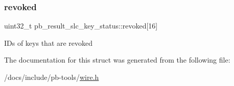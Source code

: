 \subsubsection{\texorpdfstring{revoked}{revoked}}
{\footnotesize\ttfamily uint32\+\_\+t pb\+\_\+result\+\_\+slc\+\_\+key\+\_\+status\+::revoked\mbox{[}16\mbox{]}}

ID\textquotesingle{}s of keys that are revoked 

The documentation for this struct was generated from the following file\+:\begin{DoxyCompactItemize}
\item 
/docs/include/pb-\/tools/\hyperlink{wire_8h}{wire.\+h}\end{DoxyCompactItemize}
